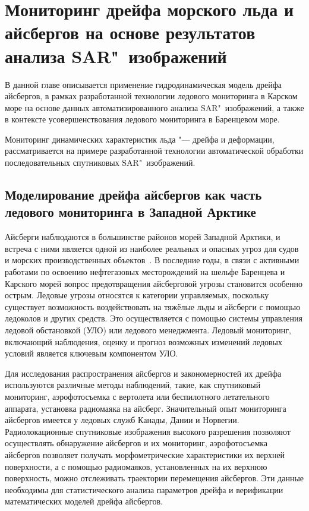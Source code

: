 \chapter{Мониторинг дрейфа морского льда и айсбергов на основе результатов анализа SAR"~изображений} \label{chapt4}

В данной главе описывается применение гидродинамическая модель дрейфа айсбергов, в рамках разработанной технологии ледового мониторинга в Карском море на основе данных автоматизированного анализа SAR"~изображений, а также в контексте усовершенствования ледового мониторинга в Баренцевом море.

Мониторинг динамических характеристик льда "--- дрейфа и деформации, рассматривается на примере разработанной технологии автоматической обработки последовательных спутниковых SAR"~изображений.

\section{Моделирование дрейфа айсбергов как часть ледового мониторинга в Западной Арктике} \label{sect4_1}

Айсберги наблюдаются в большинстве районов морей Западной Арктики, и встреча с ними является одной из наиболее реальных и опасных угроз для судов и морских производственных объектов~\cite{Mironov_Smirnov_Iceberg_2015}. В последние годы, в связи с активными работами по освоению нефтегазовых месторождений на шельфе Баренцева и Карского морей вопрос предотвращения айсберговой угрозы становится особенно острым. Ледовые угрозы относятся к категории управляемых, поскольку существует возможность воздействовать на тяжёлые льды и айсберги с помощью ледоколов и других средств. Это осуществляется с помощью системы управления ледовой обстановкой (УЛО) или ледового менеджмента. Ледовый мониторинг, включающий наблюдения, оценку и прогноз возможных изменений ледовых условий является ключевым компонентом УЛО.

Для исследования распространения айсбергов и закономерностей их дрейфа 
используются различные методы наблюдений, такие, как спутниковый мониторинг, 
аэрофотосъемка с вертолета или беспилотного летательного аппарата, установка 
радиомаяка на айсберг. Значительный опыт мониторинга айсбергов имеется у ледовых служб Канады, Дании и Норвегии. Радиолокационные спутниковые изображения высокого разрешения позволяют осуществлять обнаружение айсбергов и их мониторинг, аэрофотосъемка айсбергов позволяет получать морфометрические характеристики их верхней поверхности, а с помощью радиомаяков, установленных на их верхнюю поверхность, можно отслеживать траектории перемещения айсбергов. Эти данные необходимы для статистического анализа параметров дрейфа и верификации математических моделей дрейфа айсбергов.

